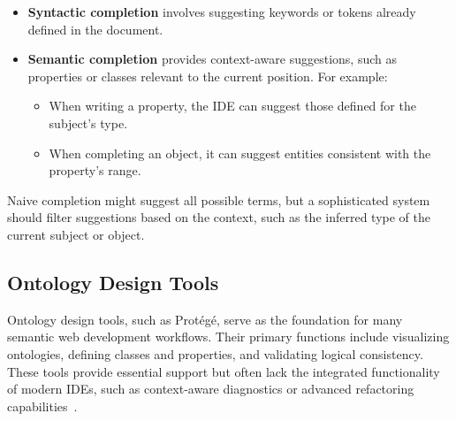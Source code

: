\begin{itemize}
    \item \textbf{Syntactic completion} involves suggesting keywords or tokens already defined in the document.
    \item \textbf{Semantic completion} provides context-aware suggestions, such as properties or classes relevant to the current position. For example:
    \begin{itemize}
        \item When writing a property, the IDE can suggest those defined for the subject's type.
        \item When completing an object, it can suggest entities consistent with the property's range.
    \end{itemize}
\end{itemize}

Naive completion might suggest all possible terms, but a sophisticated system should filter suggestions based on the context, such as the inferred type of the current subject or object.


\subsection*{Ontology Design Tools}

Ontology design tools, such as Protégé, serve as the foundation for many semantic web development workflows. 
Their primary functions include visualizing ontologies, defining classes and properties, and validating logical consistency.
These tools provide essential support but often lack the integrated functionality of modern IDEs, such as context-aware diagnostics or advanced refactoring capabilities~\cite{ComparingOntologyBuildingTools}.


